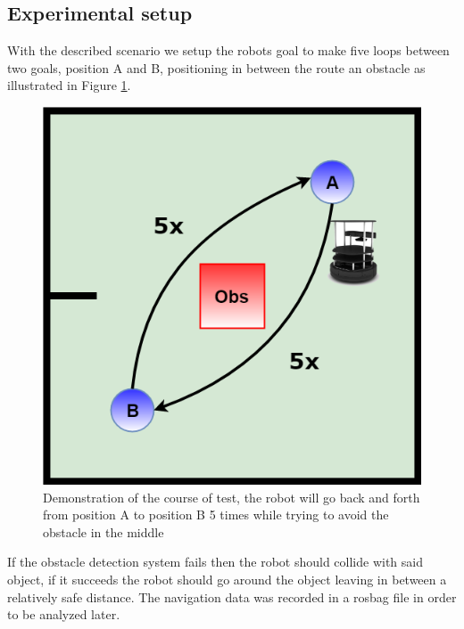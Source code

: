 \subsection{Experimental setup}
With the described scenario we setup the robots goal to make five loops between two goals, position A and B, positioning in between the route an obstacle as illustrated in  Figure \ref{fig:exp}. 
\begin{figure}[ht!]
\centerline{\includegraphics [width=0.5 \textwidth]{imgs/chapter5/exp.png}}
\caption{Demonstration of the course of test, the robot will go back and forth from position A to position B 5 times while  trying to avoid the obstacle in the middle}
\label{fig:exp}
\end{figure}

If the obstacle detection system fails then the robot should collide with said object, if it succeeds the robot should go around the object leaving in between a relatively safe distance. 
The  navigation data was recorded in a rosbag file in order to be analyzed later.

